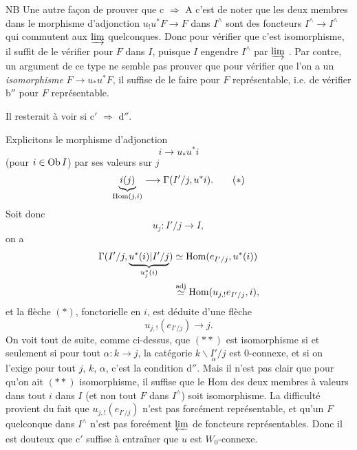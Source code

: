 NB Une autre façon de prouver que c $\Longrightarrow$ A c'est de noter que les deux membres dans le morphisme d'adjonction $u_!u^*F \longrightarrow F$ dans $I^{\wedge}$ sont des foncteurs $I^{\wedge} \longrightarrow I^{\wedge}$ qui commutent aux $\varinjlim$ quelconques. Donc pour vérifier que c'est isomorphisme, il suffit de le vérifier pour $F$ dans $I$, puisque $I$ engendre $I^{\wedge}$ par $\varinjlim$ . Par contre, un argument de ce type ne semble pas prouver que pour vérifier que l'on a un \textit{isomorphisme} $F \longrightarrow u_*u^*F$, il suffise de le faire pour $F$ représentable, i.e. de vérifier b$''$ pour $F$ représentable.

Il resterait à voir si c$'$ $\Longrightarrow$ d$''$.

Explicitons le morphisme d'adjonction
\[
i \longrightarrow u_*u^*i
\]
(pour $i \in \operatorname{Ob} I$) par ses valeurs sur $j$
\[
\underbrace{i(j)}_{\operatorname{Hom}(j,i)} \longrightarrow \Gamma(I'/j, u^*i). \tag*{$(\ast)$}
\]
Soit donc
\[
u_j : I'/j \longrightarrow I,
\]
on a
\[
\begin{aligned}
\Gamma(I'/j, \underbrace{u^*(i)|I'/j}_{u_j^*(i)}) &\simeq \Hom(e_{I'/j}, u^*(i)) \\ %
&\overset{\mathrm{adj}}{\simeq} \Hom(u_{j,!}e_{I'/j}, i),
\end{aligned}
\]
et la flèche $(\ast)$, fonctorielle en $i$, est déduite d'une flèche
\[
u_{j,!}(e_{I'/j}) \longrightarrow j. \tag*{$(\ast\ast)$}
\]
On voit tout de suite, comme ci-dessus, que $(\ast\ast)$ est isomorphisme si et seulement si pour tout $\alpha : k \longrightarrow j$, la catégorie $k\backslash\underset{\alpha}{I'}/j$ est 0-connexe, et si on l'exige pour tout $j$, $k$, $\alpha$, c'est la condition d$''$. Mais il n'est pas clair que pour qu'on ait $(\ast\ast)$ isomorphisme, il suffise que le Hom des deux membres à valeurs dans tout $i$ dans $I$ (et non tout $F$ dans $I^{\wedge}$) soit isomorphisme. La difficulté provient du fait que $u_{j,!}(e_{I'/j})$ n'est pas forcément représentable, et qu'un $F$ quelconque dans $I^{\wedge}$ n'est pas forcément $\varprojlim$ de foncteurs représentables. Donc il est douteux que c$'$ suffise à entraîner que $u$ est $W_0$-connexe.

